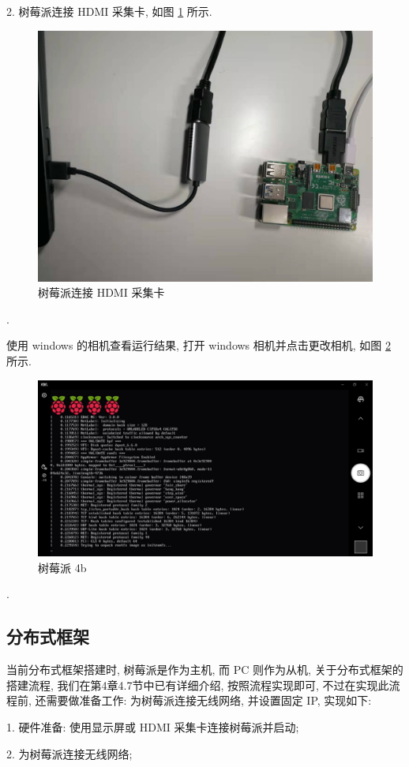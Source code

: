 \documentclass[openany, fontset=windowsold]{ctexbook}
\theoremstyle{kaiti}
\theoremstyle{normal}
\begin{document}
2. 树莓派连接 HDMI 采集卡, 如图 \ref{fig:Raspberry_Pi_HDMI} 所示.

\begin{figure}[!ht]
  \centering
  \includegraphics[width=.5\textwidth]{Raspberry_Pi_HDMI.jpg}
  \caption{树莓派连接 HDMI 采集卡}
  \label{fig:Raspberry_Pi_HDMI}
\end{figure}.

使用 windows 的相机查看运行结果, 打开 windows 相机并点击更改相机, 如图 \ref{fig:Raspberry_Pi_camera} 所示.

\begin{figure}[!ht]
  \centering
  \includegraphics[width=.9\textwidth]{Raspberry_Pi_camera.png}
  \caption{树莓派 4b}
  \label{fig:Raspberry_Pi_camera}
\end{figure}.

\subsection{分布式框架}

当前分布式框架搭建时, 树莓派是作为主机, 而 PC 则作为从机, 关于分布式框架的搭建流程, 我们在第4章4.7节中已有详细介绍, 按照流程实现即可, 不过在实现此流程前, 还需要做准备工作: 为树莓派连接无线网络, 并设置固定 IP, 实现如下: 

1. 硬件准备: 使用显示屏或 HDMI 采集卡连接树莓派并启动; 

2. 为树莓派连接无线网络; 
\end{document}
